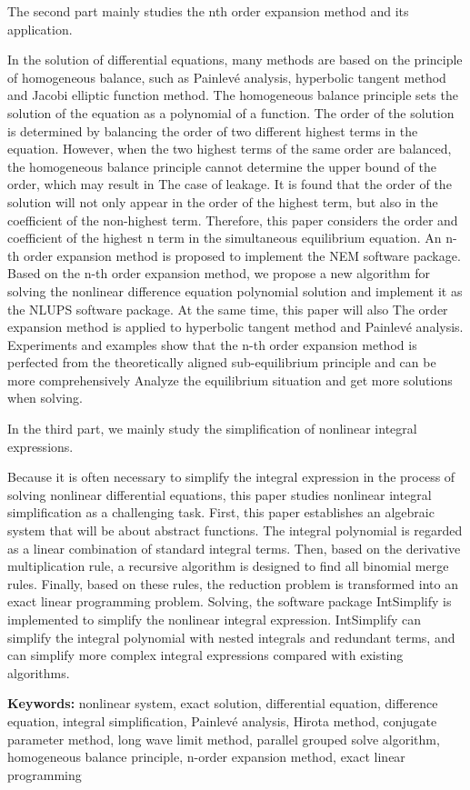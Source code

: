 The second part mainly studies the nth order expansion method and its application.

In the solution of differential equations, many methods are based on the principle of homogeneous balance, such as Painlevé analysis, hyperbolic tangent method and Jacobi elliptic function method. The homogeneous balance principle sets the solution of the equation as a polynomial of a function. The order of the solution is determined by balancing the order of two different highest terms in the equation. However, when the two highest terms of the same order are balanced, the homogeneous balance principle cannot determine the upper bound of the order, which may result in The case of leakage. It is found that the order of the solution will not only appear in the order of the highest term, but also in the coefficient of the non-highest term. Therefore, this paper considers the order and coefficient of the highest n term in the simultaneous equilibrium equation. An n-th order expansion method is proposed to implement the NEM software package. Based on the n-th order expansion method, we propose a new algorithm for solving the nonlinear difference equation polynomial solution and implement it as the NLUPS software package. At the same time, this paper will also The order expansion method is applied to hyperbolic tangent method and Painlevé analysis. Experiments and examples show that the n-th order expansion method is perfected from the theoretically aligned sub-equilibrium principle and can be more comprehensively Analyze the equilibrium situation and get more solutions when solving.

In the third part, we mainly study the simplification of nonlinear integral expressions.

Because it is often necessary to simplify the integral expression in the process of solving nonlinear differential equations, this paper studies nonlinear integral simplification as a challenging task. First, this paper establishes an algebraic system that will be about abstract functions. The integral polynomial is regarded as a linear combination of standard integral terms. Then, based on the derivative multiplication rule, a recursive algorithm is designed to find all binomial merge rules. Finally, based on these rules, the reduction problem is transformed into an exact linear programming problem. Solving, the software package IntSimplify is implemented to simplify the nonlinear integral expression. IntSimplify can simplify the integral polynomial with nested integrals and redundant terms, and can simplify more complex integral expressions compared with existing algorithms.

\bigskip
\noindent\textbf{ Keywords:}
nonlinear system, exact solution, differential equation, difference equation, integral simplification, Painlevé analysis, Hirota method, conjugate parameter method, long wave limit method, parallel grouped solve algorithm, homogeneous balance principle, n-order expansion method, exact linear programming
